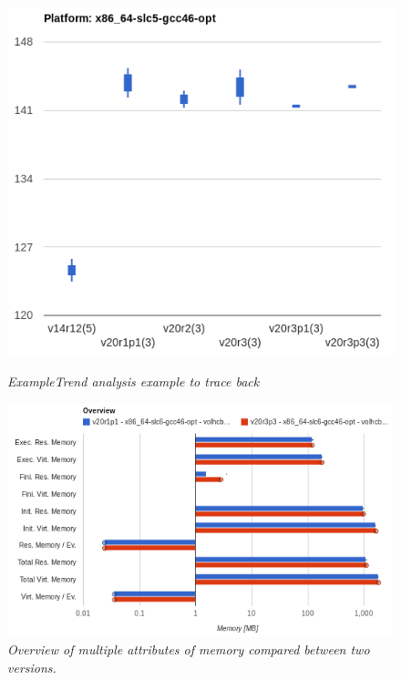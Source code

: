 \documentclass[a4paper]{jpconf}
\begin{document}
\begin{figure}[t]
\begin{minipage}[t]{17pc}
\includegraphics[scale=0.4]{figures/moore_trend_analysis.png}
\caption{\small \textit{ExampleTrend analysis example to trace back}}
\label{fig:trend}
\end{minipage}\hspace{1pc}%
\begin{minipage}[t]{17pc}
\includegraphics[scale=0.4]{figures/moore_overview_memory.png}
\caption{\small \textit{Overview of multiple attributes of memory compared between two versions.}}
\label{fig:overview}
\end{minipage}
\end{figure}
\end{document}
